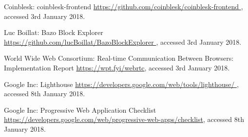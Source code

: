 \begin{thebibliography}{99}
 Coinblesk: coinblesk-frontend \url{https://github.com/coinblesk/coinblesk-frontend
}, accessed 3rd January 2018.

 Luc Boillat: Bazo Block Explorer \url{https://github.com/lucBoillat/BazoBlockExplorer
}, accessed 3rd January 2018.

 World Wide Web Consortium: Real-time Communication Between Browsers: Implementation Report \url{https://wpt.fyi/webrtc}, accessed 3rd January 2018.

 Google Inc: Lighthouse \url{https://developers.google.com/web/tools/lighthouse/
}, accessed 8th January 2018.

 Google Inc: Progressive Web Application Checklist \url{https://developers.google.com/web/progressive-web-apps/checklist}, accessed 8th January 2018.


\end{thebibliography}


